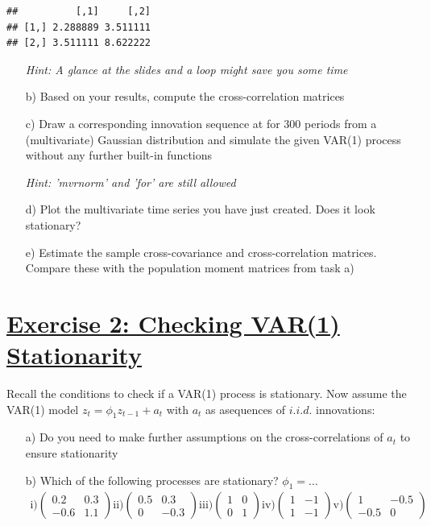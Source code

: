 \documentclass[12pt,a4paper]{article}
\newcommand{\tmpsection}[1]{}
\let\tmpsection=\section
\renewcommand{\section}[1]{\tmpsection{\underline{#1}} }
\begin{document}
\begin{verbatim}
##          [,1]     [,2]
## [1,] 2.288889 3.511111
## [2,] 3.511111 8.622222
\end{verbatim}

\begin{itemize}  
  \item[] \textit{Hint: A glance at the slides and a loop might save you some time}
  \item[b)] Based on your results, compute the cross-correlation matrices
  \item[c)] Draw a corresponding innovation sequence at for 300 periods from a (multivariate) Gaussian distribution and simulate the given VAR(1) process without any further built-in functions
  \item[] \textit{Hint: 'mvrnorm' and 'for' are still allowed}
  \item[d)] Plot the multivariate time series you have just created. Does it look stationary?
  \item[e)] Estimate the sample cross-covariance and cross-correlation matrices. Compare these with the population moment matrices from task a)
\end{itemize}

\hypertarget{exercise-2-checking-var1-stationarity}{%
\section{Exercise 2: Checking VAR(1)
Stationarity}\label{exercise-2-checking-var1-stationarity}}

Recall the conditions to check if a VAR(1) process is stationary. Now
assume the VAR(1) model \(z_t = \phi_1 z_{t-1} + a_t\) with \(a_t\) as
asequences of \(i.i.d.\) innovations:

\begin{itemize}
  \item[a)] Do you need to make further assumptions on the cross-correlations of $a_t$ to ensure stationarity
  \item[b)] Which of the following processes are stationary? $\phi_1 = \ldots$
  \begin{align*}
    \text{i)} 
    \begin{pmatrix}
      0.2 & 0.3 \\
      -0.6 & 1.1
    \end{pmatrix}
    \text{ii)} 
    \begin{pmatrix}
      0.5 & 0.3 \\
      0 & -0.3
    \end{pmatrix}
    \text{iii)} 
    \begin{pmatrix}
      1 & 0 \\
      0 & 1
    \end{pmatrix}
    \text{iv)} 
    \begin{pmatrix}
      1 & -1 \\
      1 & -1
    \end{pmatrix}
    \text{v)} 
    \begin{pmatrix}
      1 & -0.5 \\
      -0.5 & 0
    \end{pmatrix}
  \end{align*}
\end{itemize}
\end{document}
